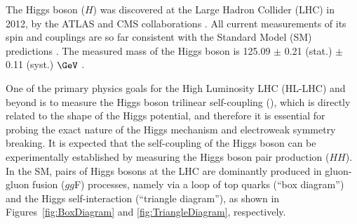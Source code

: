 The Higgs boson ($H$) was discovered at the Large Hadron Collider (LHC) in 2012, by the ATLAS and CMS
collaborations \cite{HIGG-2012-27,CMS-HIG-12-028}.
All current measurements of its spin and couplings \cite{HIGG-2013-02,HIGG-2013-17,CMS-HIG-13-033,CMS-HIG-13-002,CMS-HIG-13-023}
are so far consistent with the Standard Model (SM) predictions \cite{PhysRevLett.13.321,HIGGS1964132,PhysRevLett.13.508,PhysRev.145.1156,PhysRevLett.13.585,PhysRev.155.1554}.
The measured mass of the Higgs boson is 125.09 $\pm$ 0.21 (stat.) $\pm$ 0.11 (syst.) $\GeV$ \cite{HIGG-2014-14}.

One of the primary physics goals for the High Luminosity LHC (HL-LHC) and beyond is to measure the Higgs boson trilinear self-coupling (\hhh), which is directly related to the shape of the Higgs potential, and therefore it is essential for probing the exact nature of the Higgs mechanism and electroweak symmetry breaking. It is expected that the self-coupling of the Higgs boson can be experimentally established by measuring the Higgs boson pair production ($HH$). In the SM, pairs of Higgs bosons at the LHC are dominantly produced in gluon-gluon fusion ($gg$F) processes, namely via a loop of top quarks (“box diagram”) and the Higgs self-interaction (“triangle diagram”), as shown in Figures~\ref{fig:BoxDiagram} and \ref{fig:TriangleDiagram}, respectively.

